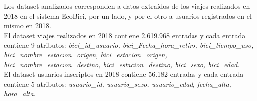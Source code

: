 Los dataset analizados corresponden a datos extraídos de los viajes realizados en 2018 en el sistema EcoBici, por un lado, y por el otro a usuarios registrados en el mismo en 2018.\\
El dataset viajes realizados en 2018 contiene 2.619.968 entradas y cada entrada contiene 9 atributos: \textit{bici_id_usuario, bici_Fecha_hora_retiro, bici_tiempo_uso, bici_nombre_estacion_origen, bici_estacion_origen, bici_nombre_estacion_destino, bici_estacion_destino, bici_sexo, bici_edad}.\\
El dataset usuarios inscriptos en 2018 contiene 56.182 entradas y cada entrada contiene 5 atributos: \textit{usuario_id, usuario_sexo, usuario_edad, fecha_alta, hora_alta}.